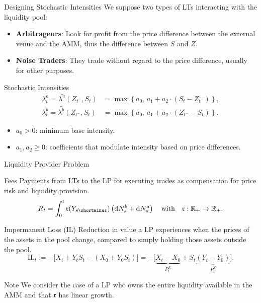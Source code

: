 \documentclass[10pt]{beamer}
\newcommand{\fee}{\mathfrak{r}}
\begin{document}
\begin{frame}{Designing Stochastic Intensities}
We suppose two types of LTs interacting with the liquidity pool:\pause
\vspace{-0.5em}
    \begin{itemize}
        \item \textbf{Arbitrageurs}: Look for profit from the price difference between the external venue and the AMM, thus the difference between $S$ and $Z$.\pause
        \item \textbf{Noise Traders}: They trade without regard to the price difference, usually for other purposes.\pause
    \end{itemize}

\begin{block}{Stochastic Intensities}\pause
        \begin{equation}
        \begin{aligned}
        \lambda^a_t = \bar{\lambda^a}(Z_{t^-}, S_t) &= \max\left\{ a_0, \, a_1 + a_2 \cdot (S_t - Z_{t^-}) \right\}, \\
        \lambda^b_t = \bar{\lambda^b}(Z_{t^-}, S_t) &= \max\left\{ a_0, \, a_1 + a_2 \cdot (Z_{t^-} - S_t) \right\}. \nonumber        
        \end{aligned}
        \end{equation}
        \begin{itemize}
            \item $a_0 > 0$: minimum base intensity.
            \item $a_1, a_2 \geq 0$: coefficients that modulate intensity based on price differences.
        \end{itemize}
    \end{block}

\end{frame}

\begin{frame}{Liquidity Provider Problem}

\begin{block}{Fees}\pause
Payments from LTs to the LP for executing trades as compensation for price risk and liquidity provision.
$$R_t= \int_0^t \fee(Y_{s\shortminus}) \left(\text{d} N^b_s + \text{d} N^a_s \right) \quad \text{with} \quad \fee : \mathbb{R_+} \rightarrow \mathbb{R_+}.$$
\end{block}

\begin{block}{Impermanent Loss (IL)}\pause
Reduction in value a LP experiences when the prices of the assets in the pool change, compared to simply holding those assets outside the pool.
$$\text{IL}_t := -\big[ X_t + Y_t S_t - (X_0 + Y_0 S_t) \big] = -\Big[ \underbrace{X_t - X_0}_{P^X_t} + S_t \underbrace{(Y_t - Y_0)}_{P^Y_t} \Big].$$
\end{block}\pause

\begin{alertblock}{Note}
We consider the case of a LP who owns the entire liquidity available in the AMM and that $\fee$ has linear growth.
\end{alertblock}

\end{frame}
\end{document}
